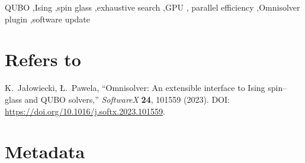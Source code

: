 \documentclass[preprint,12pt,a4paper]{elsarticle}
\begin{document}
\begin{frontmatter}
\begin{keyword}
QUBO \sep Ising \sep spin glass \sep exhaustive search \sep GPU \sep
parallel efficiency \sep Omnisolver plugin \sep software update
\end{keyword}

\end{frontmatter}

\section*{Refers to}
K.~Ja\l{}owiecki, {\L}.~Pawela, ``Omnisolver: An extensible interface to Ising
spin--glass and QUBO solvers,'' \emph{SoftwareX} \textbf{24}, 101559 (2023).
DOI: \url{https://doi.org/10.1016/j.softx.2023.101559}.

\section*{Metadata}
\label{metadata}
\end{document}
